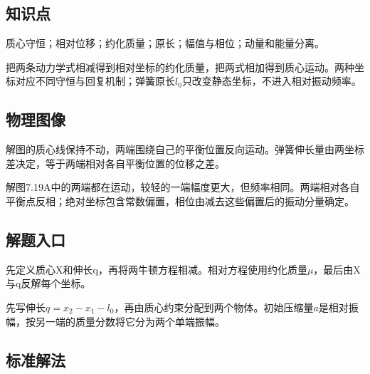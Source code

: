 \documentclass[UTF8,fontset=fandol,a4paper,11pt]{ctexart}
\begin{document}


\subsection*{知识点}

质心守恒；相对位移；约化质量；原长；幅值与相位；动量和能量分离。

把两条动力学式相减得到相对坐标的约化质量，把两式相加得到质心运动。两种坐标对应不同守恒与回复机制；弹簧原长$l_0$只改变静态坐标，不进入相对振动频率。




\subsection*{物理图像}

解图的质心线保持不动，两端围绕自己的平衡位置反向运动。弹簧伸长量由两坐标差决定，等于两端相对各自平衡位置的位移之差。

解图7.19A中的两端都在运动，较轻的一端幅度更大，但频率相同。两端相对各自平衡点反相；绝对坐标包含常数偏置，相位由减去这些偏置后的振动分量确定。




\subsection*{解题入口}

先定义质心X和伸长q，再将两牛顿方程相减。相对方程使用约化质量\(\mu\)，最后由X与q反解每个坐标。

先写伸长$q=x_2-x_1-l_0$，再由质心约束分配到两个物体。初始压缩量$a$是相对振幅，按另一端的质量分数将它分为两个单端振幅。





\subsection*{标准解法}
\end{document}
